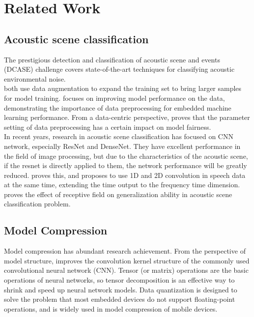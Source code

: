 \documentclass[conference]{IEEEtran}
\begin{document}
	\section{Related Work}
	\subsection{Acoustic scene classification}
	The prestigious detection and classification of acoustic scene and events
	(DCASE)\cite{RN200} challenge covers state-of-the-art techniques for classifying acoustic environmental noise.\\ 
	\cite{2019}\cite{10.1145/3485730.3493448}\cite{Hannun2014DeepSS} both use data
	augmentation to expand the training set to bring larger samples for model
	training.
	\cite{2019} focuses on improving model performance on the data, demonstrating
	the importance of data preprocessing for embedded machine learning performance.
	From a data-centric perspective, \cite{10.1145/3485730.3493448} proves that the
	parameter setting of data preprocessing has a certain impact on model
	fairness.\\
	In recent years, research in acoustic scene classification has focused on CNN
	network\cite{electronics10040371}, especially ResNet\cite{he2015deep} and
	DenseNet\cite{huang2018densely}.
	They have excellent performance in the field of image processing, but due to the
	characteristics of the acoustic scene, if the resnet is directly applied to
	them, the network performance will be greatly reduced.
	\cite{Kim2021BroadcastedRL} proves this, and proposes to use 1D and 2D
	convolution in speech data at the same time, extending the time output to the
	frequency time dimension. \cite{koutini2019receptive} proves the effect of
	receptive field on generalization ability in acoustic scene classification
	problem.
	\subsection{Model Compression}
	Model compression has abundant research achievement\cite{9043731}. From the
	perspective of model structure, \cite{szegedy2015rethinking}\cite{wu2017shift}
	improves the convolution kernel structure of the commonly used convolutional
	neural network (CNN). \cite{1102314}Tensor (or matrix) operations are the basic
	operations of neural networks, so tensor decomposition is an effective way to
	shrink and speed up neural network models.
	\cite{10.5555/2969442.2969588}\cite{6986082}\cite{deng2018gxnornet}Data
	quantization is designed to solve the problem that most embedded devices do not
	support floating-point operations, and is widely used in model compression of
	mobile devices.
	
\end{document}
